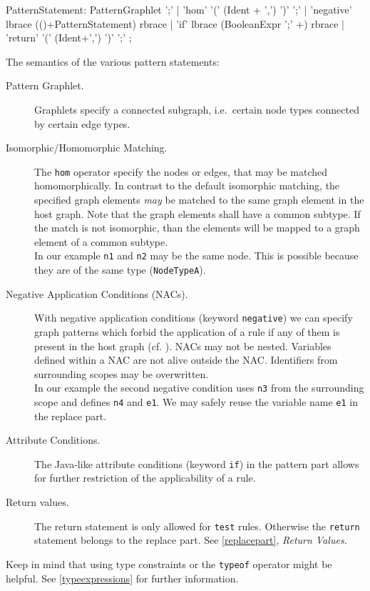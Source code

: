 \begin{rail}  
  PatternStatement: 
    PatternGraphlet ';' |
    'hom' '(' (Ident + ',') ')' ';' |
    'negative' lbrace (()+PatternStatement) rbrace |
    'if' lbrace (BooleanExpr ';' +) rbrace |
    'return' '(' (Ident+',') ')' ';' ;
\end{rail}
The semantics of the various pattern statements:
\begin{description}
  \item[Pattern Graphlet.] Graphlets specify a connected subgraph, i.e.\ certain node types connected by certain edge types.
  \item[Isomorphic/Homomorphic Matching.] The \texttt{hom} operator specify the nodes or edges, that may be matched homomorphically. In contrast to the default isomorphic matching, the specified graph elements \emph{may} be matched to the same graph element in the host graph. Note that the graph elements shall have a common subtype. If the match is not isomorphic, than the elements will be mapped to a graph element of a common subtype.\\
  In our example \texttt{n1} and \texttt{n2} may be the same node. This is possible because they are of the  same type (\texttt{NodeTypeA}).
  \item[Negative Application Conditions (NACs).] With negative application conditions (keyword \texttt{negative}) we can specify graph patterns which forbid the application of a rule if any of them is present in the host graph (cf. \cite{adam}). NACs may not be nested. Variables defined within a NAC are not alive outside the NAC. Identifiers from surrounding scopes may be overwritten.\\
  In our example the second negative condition uses \texttt{n3} from the surrounding scope and defines \texttt{n4} and \texttt{e1}. We may safely reuse the variable name \texttt{e1} in the replace part.
  \item[Attribute Conditions.] The Java-like attribute conditions (keyword \texttt{if}) in the pattern part allows for further restriction of the applicability of a rule.
  \item[Return values.] The return statement is only allowed for \texttt{test} rules. Otherwise the \texttt{return} statement belongs to the replace part. See \ref{replacepart}, \emph{Return Values}.
\end{description}
Keep in mind that using type constraints or the \texttt{typeof} operator might be helpful. See \ref{typeexpressions} for further information.

